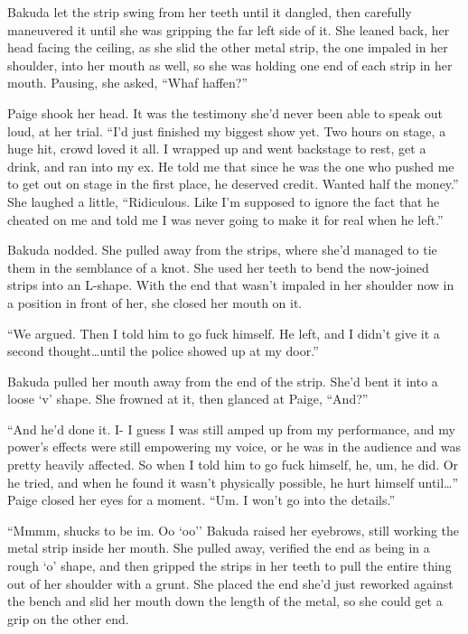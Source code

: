 Bakuda let the strip swing from her teeth until it dangled, then carefully maneuvered it until she was gripping the far left side of it.  She leaned back, her head facing the ceiling, as she slid the other metal strip, the one impaled in her shoulder, into her mouth as well, so she was holding one end of each strip in her mouth.  Pausing, she asked, ``Whaf haffen?''



Paige shook her head.  It was the testimony she'd never been able to speak out loud, at her trial.  ``I'd just finished my biggest show yet.  Two hours on stage, a huge hit, crowd loved it all.  I wrapped up and went backstage to rest, get a drink, and ran into my ex.  He told me that since he was the one who pushed me to get out on stage in the first place, he deserved credit.  Wanted half the money.''  She laughed a little, ``Ridiculous.  Like I'm supposed to ignore the fact that he cheated on me and told me I was never going to make it for real when he left.''



Bakuda nodded.  She pulled away from the strips, where she'd managed to tie them in the semblance of a knot.  She used her teeth to bend the now-joined strips into an L-shape.  With the end that wasn't impaled in her shoulder now in a position in front of her, she closed her mouth on it.



``We argued.  Then I told him to go fuck himself.  He left, and I didn't give it a second thought\ldots until the police showed up at my door.''



Bakuda pulled her mouth away from the end of the strip.  She'd bent it into a loose `v' shape.  She frowned at it, then glanced at Paige, ``And?''



``And he'd done it.  I- I guess I was still amped up from my performance, and my power's effects were still empowering my voice, or he was in the audience and was pretty heavily affected.  So when I told him to go fuck himself, he, um, he did.  Or he tried, and when he found it wasn't physically possible, he hurt himself until\ldots''  Paige closed her eyes for a moment.  ``Um.  I won't go into the details.''



``Mmmm, shucks to be im.  Oo `oo'' Bakuda raised her eyebrows, still working the metal strip inside her mouth.  She pulled away, verified the end as being in a rough `o' shape, and then gripped the strips in her teeth to pull the entire thing out of her shoulder with a grunt.  She placed the end she'd just reworked against the bench and slid her mouth down the length of the metal, so she could get a grip on the other end.



